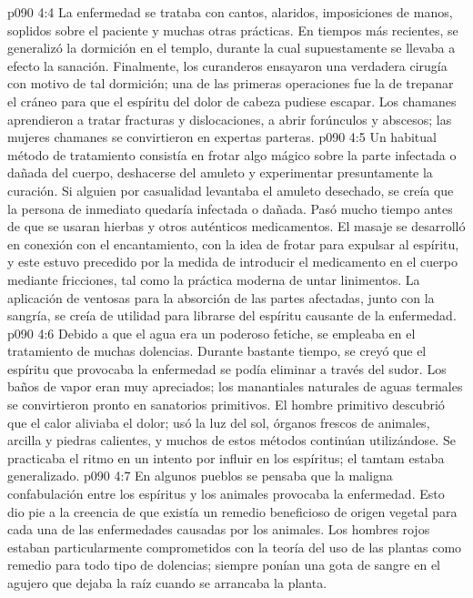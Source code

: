 \vs p090 4:4 La enfermedad se trataba con cantos, alaridos, imposiciones de manos, soplidos sobre el paciente y muchas otras prácticas. En tiempos más recientes, se generalizó la dormición en el templo, durante la cual supuestamente se llevaba a efecto la sanación. Finalmente, los curanderos ensayaron una verdadera cirugía con motivo de tal dormición; una de las primeras operaciones fue la de trepanar el cráneo para que el espíritu del dolor de cabeza pudiese escapar. Los chamanes aprendieron a tratar fracturas y dislocaciones, a abrir forúnculos y abscesos; las mujeres chamanes se convirtieron en expertas parteras.
\vs p090 4:5 Un habitual método de tratamiento consistía en frotar algo mágico sobre la parte infectada o dañada del cuerpo, deshacerse del amuleto y experimentar presuntamente la curación. Si alguien por casualidad levantaba el amuleto desechado, se creía que la persona de inmediato quedaría infectada o dañada. Pasó mucho tiempo antes de que se usaran hierbas y otros auténticos medicamentos. El masaje se desarrolló en conexión con el encantamiento, con la idea de frotar para expulsar al espíritu, y este estuvo precedido por la medida de introducir el medicamento en el cuerpo mediante fricciones, tal como la práctica moderna de untar linimentos. La aplicación de ventosas para la absorción de las partes afectadas, junto con la sangría, se creía de utilidad para librarse del espíritu causante de la enfermedad.
\vs p090 4:6 Debido a que el agua era un poderoso fetiche, se empleaba en el tratamiento de muchas dolencias. Durante bastante tiempo, se creyó que el espíritu que provocaba la enfermedad se podía eliminar a través del sudor. Los baños de vapor eran muy apreciados; los manantiales naturales de aguas termales se convirtieron pronto en sanatorios primitivos. El hombre primitivo descubrió que el calor aliviaba el dolor; usó la luz del sol, órganos frescos de animales, arcilla y piedras calientes, y muchos de estos métodos continúan utilizándose. Se practicaba el ritmo en un intento por influir en los espíritus; el tamtam estaba generalizado.
\vs p090 4:7 En algunos pueblos se pensaba que la maligna confabulación entre los espíritus y los animales provocaba la enfermedad. Esto dio pie a la creencia de que existía un remedio beneficioso de origen vegetal para cada una de las enfermedades causadas por los animales. Los hombres rojos estaban particularmente comprometidos con la teoría del uso de las plantas como remedio para todo tipo de dolencias; siempre ponían una gota de sangre en el agujero que dejaba la raíz cuando se arrancaba la planta.
